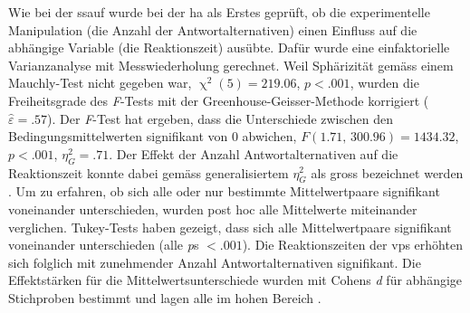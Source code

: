 \documentclass[11pt, twoside, a4paper]{book}		%
\begin{document}
Wie bei der \gls{ssauf} wurde bei der \gls{ha} als Erstes geprüft, ob die experimentelle Manipulation (die Anzahl der Antwortalternativen) einen Einfluss auf die abhängige Variable (die Reaktionszeit) ausübte. Dafür wurde eine einfaktorielle Varianzanalyse mit Messwiederholung gerechnet.
Weil Sphärizität gemäss einem Mauchly-Test nicht gegeben war, $\upchi^2(5)=219.06$, $p<.001$, wurden die Freiheitsgrade des \textit{F}-Tests mit der Greenhouse-Geisser-Methode korrigiert ($\hat{\varepsilon}=.57$). Der \textit{F}-Test hat ergeben, dass die Unterschiede zwischen den Bedingungsmittelwerten signifikant von 0 abwichen, $F(1.71,\,300.96)=1434.32$, $p<.001$, $\eta_{G}^2=.71$. Der Effekt der Anzahl Antwortalternativen auf die Reaktionszeit konnte dabei gemäss generalisiertem $\eta_{G}^2$ \citep{Olejnik2003} als gross bezeichnet werden \citep[S. 383]{Bakeman2005}.
Um zu erfahren, ob sich alle oder nur bestimmte Mittelwertpaare signifikant voneinander unterschieden, wurden post hoc alle Mittelwerte miteinander verglichen.
Tukey-Tests haben gezeigt, dass sich alle Mittelwertpaare signifikant voneinander unterschieden (alle \textit{p}s $<.001$).
Die Reaktionszeiten der \glspl{vp} erhöhten sich folglich mit zunehmender Anzahl Antwortalternativen signifikant.
Die Effektstärken für die Mittelwertsunterschiede wurden mit Cohens \textit{d} für abhängige Stichproben \citep{Gibbons1993} bestimmt und lagen alle im hohen Bereich \citep[][S. 40; siehe \autoref{tab:hick_effect_sizes}]{Cohen1988}.
\end{document}
